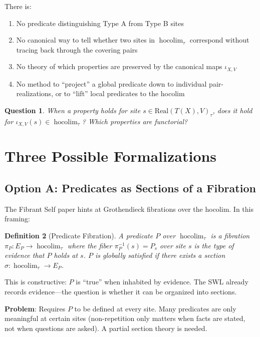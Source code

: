 \documentclass[11pt,a4paper]{article}
\newtheorem{definition}{Definition}[section]
\newtheorem{question}[definition]{Question}
\newcommand{\Hocolim}{\operatorname{hocolim}}
\begin{document}
There is:
\begin{enumerate}[nosep]
  \item No predicate distinguishing Type A from Type B sites
  \item No canonical way to tell whether two sites in $\Hocolim_\tau$ correspond
    without tracing back through the covering pairs
  \item No theory of which properties are preserved by the canonical maps $\iota_{X,V}$
  \item No method to ``project'' a global predicate down to individual pair-realizations,
    or to ``lift'' local predicates to the hocolim
\end{enumerate}

\begin{question}
When a property holds for site $s \in \text{Real}(T(X), V)_\tau$, does it hold for
$\iota_{X,V}(s) \in \Hocolim_\tau$? Which properties are functorial?
\end{question}


\section{Three Possible Formalizations}
\label{sec:options}

\subsection{Option A: Predicates as Sections of a Fibration}

The Fibrant Self paper hints at Grothendieck fibrations over the hocolim. In this
framing:

\begin{definition}[Predicate Fibration]
A predicate $P$ over $\Hocolim_\tau$ is a fibration $\pi_P : E_P \to \Hocolim_\tau$
where the fiber $\pi_P^{-1}(s) = P_s$ over site $s$ is the type of evidence that
$P$ holds at $s$. $P$ is \emph{globally satisfied} if there exists a section
$\sigma : \Hocolim_\tau \to E_P$.
\end{definition}

This is constructive: $P$ is ``true'' when inhabited by evidence. The SWL already
records evidence---the question is whether it can be organized into sections.

\textbf{Problem}: Requires $P$ to be defined at every site. Many predicates are
only meaningful at certain sites (non-repetition only matters when facts are stated,
not when questions are asked). A partial section theory is needed.
\end{document}
